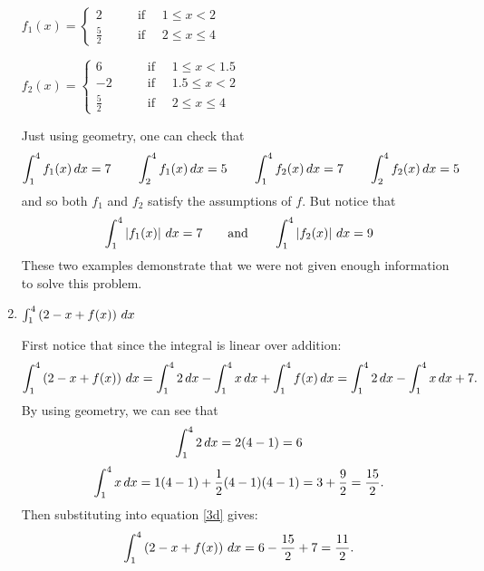 \documentclass[ nooutcomes]{ximera}
\begin{document}
\begin{problem}
\begin{enumerate}
\begin{freeResponse}
		$f_1(x) =   \left\{ \begin{array}{cl}
	2		 	&	\qquad \text{if } \quad 1 \leq x < 2					\\
	\frac{5}{2}		&	\qquad \text{if } \quad 2 \leq x \leq 4		\end{array} \right.  $
	
	$f_2(x) =   \left\{ \begin{array}{cl}
	6		 	&	\qquad \text{if } \quad 1 \leq x < 1.5					\\
	-2		 	&	\qquad \text{if } \quad 1.5 \leq x < 2					\\
	\frac{5}{2}		&	\qquad \text{if } \quad 2 \leq x \leq 4		\end{array} \right.  $
	
	Just using geometry, one can check that
	$$ \int_1^4 f_1(x)\,d x = 7	\qquad	\int_2^4 f_1(x)\,d x = 5	\qquad	\int_1^4 f_2(x)\,d x = 7	\qquad	\int_2^4 f_2(x)\,d x = 5 $$
	and so both $f_1$ and $f_2$ satisfy the assumptions of $f$.  But notice that
	$$\int_1^4 \left| f_1(x) \right| \,d x = 7	\qquad	\text{and}		\qquad	\int_1^4 \left| f_2(x) \right| \,d x = 9  $$
	These two examples demonstrate that we were not given enough information to solve this problem.
		
		\end{freeResponse}
		
	\item  $\int_1^4 \left( 2 - x + f(x) \right) \,d x$
		\begin{freeResponse}
		First notice that since the integral is linear over addition:
			\begin{equation}\label{3d}
			\int_1^4 \left( 2 - x + f(x) \right) \,d x = \int_1^4 2 \,d x - \int_1^4 x \,d x + \int_1^4 f(x) \,d x = \int_1^4 2 \,d x - \int_1^4 x \,d x + 7.
			\end{equation}
		By using geometry, we can see that
			\begin{equation*}
			\int_1^4 2 \,d x = 2(4-1) = 6
			\end{equation*}
			\begin{equation*}
			\int_1^4 x \,d x = 1(4-1) + \frac{1}{2} (4-1)(4-1) = 3 + \frac{9}{2} = \frac{15}{2}.
			\end{equation*}
		Then substituting into equation \eqref{3d} gives:
			\begin{equation*}
			\int_1^4 \left( 2 - x + f(x) \right) \,d x = 6 - \frac{15}{2} + 7 = \frac{11}{2}.
			\end{equation*}
		\end{freeResponse}
	\end{enumerate}
\end{problem}
\end{document}
